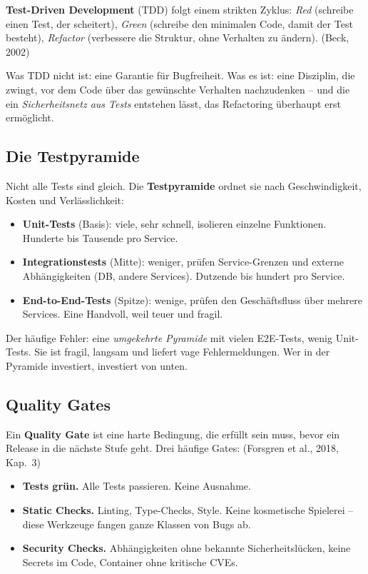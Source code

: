 \documentclass[11pt,a4paper,oneside]{article}
\newcommand{\fachbegriff}[1]{\textbf{#1}}
\newcommand{\quelle}[1]{{\footnotesize\color{lpGray}(#1)}}
\begin{document}
\fachbegriff{Test-Driven Development} (TDD) folgt einem strikten Zyklus: \emph{Red} (schreibe einen Test, der scheitert), \emph{Green} (schreibe den minimalen Code, damit der Test besteht), \emph{Refactor} (verbessere die Struktur, ohne Verhalten zu ändern). \quelle{Beck, 2002}

Was TDD nicht ist: eine Garantie für Bugfreiheit. Was es ist: eine Disziplin, die zwingt, vor dem Code über das gewünschte Verhalten nachzudenken -- und die ein \emph{Sicherheitsnetz aus Tests} entstehen lässt, das Refactoring überhaupt erst ermöglicht.

\subsection{Die Testpyramide}

Nicht alle Tests sind gleich. Die \fachbegriff{Testpyramide} ordnet sie nach Geschwindigkeit, Kosten und Verlässlichkeit:

\begin{itemize}
  \item \textbf{Unit-Tests} (Basis): viele, sehr schnell, isolieren einzelne Funktionen. Hunderte bis Tausende pro Service.
  \item \textbf{Integrationstests} (Mitte): weniger, prüfen Service-Grenzen und externe Abhängigkeiten (DB, andere Services). Dutzende bis hundert pro Service.
  \item \textbf{End-to-End-Tests} (Spitze): wenige, prüfen den Geschäftsfluss über mehrere Services. Eine Handvoll, weil teuer und fragil.
\end{itemize}

Der häufige Fehler: eine \emph{umgekehrte Pyramide} mit vielen E2E-Tests, wenig Unit-Tests. Sie ist fragil, langsam und liefert vage Fehlermeldungen. Wer in der Pyramide investiert, investiert von unten.

\subsection{Quality Gates}

Ein \fachbegriff{Quality Gate} ist eine harte Bedingung, die erfüllt sein muss, bevor ein Release in die nächste Stufe geht. Drei häufige Gates: \quelle{Forsgren et al., 2018, Kap.~3}

\begin{itemize}
  \item \textbf{Tests grün.} Alle Tests passieren. Keine Ausnahme.
  \item \textbf{Static Checks.} Linting, Type-Checks, Style. Keine kosmetische Spielerei -- diese Werkzeuge fangen ganze Klassen von Bugs ab.
  \item \textbf{Security Checks.} Abhängigkeiten ohne bekannte Sicherheitslücken, keine Secrets im Code, Container ohne kritische CVEs.
\end{itemize}
\end{document}
